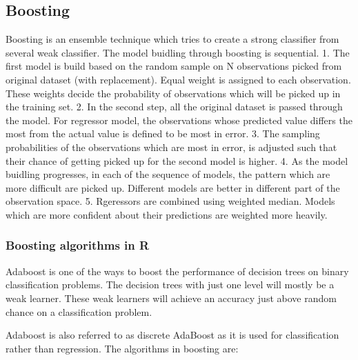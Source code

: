 \documentclass[11pt]{article}
\begin{document}
    \hypertarget{boosting}{%
\subsection{Boosting}\label{boosting}}

Boosting is an ensemble technique which tries to create a strong
classifier from several weak classifier. The model buidling through
boosting is sequential. 1. The first model is build based on the random
sample on N observations picked from original dataset (with
replacement). Equal weight is assigned to each observation. These
weights decide the probability of observations which will be picked up
in the training set. 2. In the second step, all the original dataset is
passed through the model. For regressor model, the observations whose
predicted value differs the most from the actual value is defined to be
most in error. 3. The sampling probabilities of the observations which
are most in error, is adjusted such that their chance of getting picked
up for the second model is higher. 4. As the model buidling progresses,
in each of the sequence of models, the pattern which are more difficult
are picked up. Different models are better in different part of the
observation space. 5. Rgeressors are combined using weighted median.
Models which are more confident about their predictions are weighted
more heavily.

\hypertarget{boosting-algorithms-in-r}{%
\subsubsection{Boosting algorithms in
R}\label{boosting-algorithms-in-r}}

Adaboost is one of the ways to boost the performance of decision trees
on binary classification problems. The decision trees with just one
level will mostly be a weak learner. These weak learners will achieve an
accuracy just above random chance on a classification problem.

Adaboost is also referred to as discrete AdaBoost as it is used for
classification rather than regression. The algorithms in boosting are:
\end{document}
